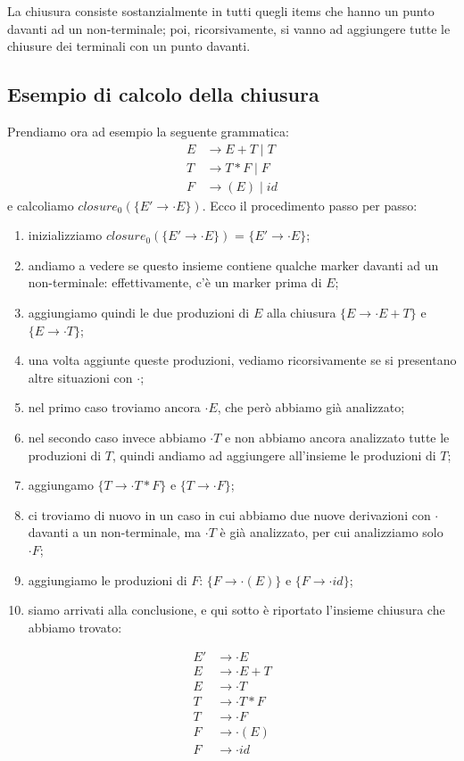 \documentclass[class=book, crop=false, oneside, 12pt]{standalone}
\begin{document}
La chiusura consiste sostanzialmente in tutti quegli items che hanno un punto davanti ad un non-terminale; poi, ricorsivamente, si vanno ad aggiungere tutte le chiusure dei terminali con un punto davanti.

\subsection{Esempio di calcolo della chiusura}
Prendiamo ora ad esempio la seguente grammatica:
\begin{align*}
    E &\to E+T \mid T\\
    T &\to T*F \mid F\\
    F &\to (E) \mid id
\end{align*}
e calcoliamo \(closure_0(\{E' \to \cdot E\})\). Ecco il procedimento passo per passo:
\begin{enumerate}
    \item inizializziamo \(closure_0(\{E' \to \cdot E\})\) = \(\{E' \to \cdot E\}\); 
    \item andiamo a vedere se questo insieme contiene qualche marker davanti ad un non-terminale: effettivamente, c'è un marker prima di \(E\);
    \item aggiungiamo quindi le due produzioni di \(E\) alla chiusura \(\{E \to \cdot E+T\}\) e \(\{E \to \cdot T\}\);
    \item una volta aggiunte queste produzioni, vediamo ricorsivamente se si presentano altre situazioni con \(\cdot\);
    \item nel primo caso troviamo ancora \(\cdot E\), che però abbiamo già analizzato;
    \item nel secondo caso invece abbiamo \(\cdot T\) e non abbiamo ancora analizzato tutte le produzioni di \(T\), quindi andiamo ad aggiungere all'insieme le produzioni di \(T\);
    \item aggiungamo \(\{T \to \cdot T * F\}\) e \(\{T \to \cdot F\}\);
    \item ci troviamo di nuovo in un caso in cui abbiamo due nuove derivazioni con \(\cdot\) davanti
    a un non-terminale, ma \(\cdot T\) è già analizzato, per cui analizziamo solo \(\cdot F\);
    \item aggiungiamo le produzioni di \(F\): \(\{F \to \cdot (E)\}\) e \(\{F \to \cdot id \}\);
    \item siamo arrivati alla conclusione, e qui sotto è riportato l'insieme chiusura che abbiamo trovato:
\end{enumerate}
\begin{align*}
    E' &\to \cdot E \\
    E  &\to \cdot E+T \\
    E  &\to \cdot T \\
    T  &\to \cdot T * F \\
    T  &\to \cdot F \\
    F  &\to \cdot (E) \\
    F  &\to \cdot id
\end{align*}
\end{document}
